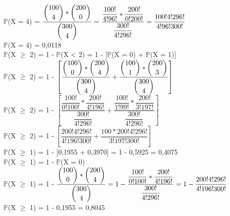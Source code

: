 \documentclass[12pt,a4paper,draft]{article}
\begin{document}
	\begin{center}
		$\mathbb{P}$(X = 4) = $\dfrac{\dbinom{100}{4} * \dbinom{200}{0}}{\dbinom{300}{4}} = \dfrac{\dfrac{100!}{4!96!} * \dfrac{200!}{0!200!}}{\dfrac{300!}{4!296!}} = \dfrac{100!4!296!}{4!96!300!}$
		\vspace{0.5cm}\\
		$\mathbb{P}$(X = 4) = 0,0118
		\vspace{1.5cm}\\
		$\mathbb{P}$(X $\geq$ 2) = 1 - $\mathbb{P}$(X < 2) = 1 - [$\mathbb{P}$(X = 0) + $\mathbb{P}$(X = 1)]
		\vspace{0.5cm}\\
		$\mathbb{P}$(X $\geq$ 2) = 1 - $\left[\dfrac{\dbinom{100}{0} * \dbinom{200}{4}}{\dbinom{300}{4}} + \dfrac{\dbinom{100}{1} * \dbinom{200}{3}}{\dbinom{300}{4}}\right]$ 
		\vspace{0.5cm}\\
		$\mathbb{P}$(X $\geq$ 2) = 1 - $\left[\dfrac{\dfrac{100!}{0!100!} * \dfrac{200!}{4!196!}}{\dfrac{300!}{4!296!}} + \dfrac{\dfrac{100!}{1!99!} * \dfrac{200!}{3!197!}}{\dfrac{300!}{4!296!}}\right]$
		\vspace{0.5cm}\\
		$\mathbb{P}$(X $\geq$ 2) = 1 - $\left[\dfrac{200!4!296!}{4!196!300!} + \dfrac{100 * 200!4!296!}{3!197!300!}\right]$
		\vspace{0.5cm}\\
		$\mathbb{P}$(X $\geq$ 1) = 1 - [0,1955 + 0,3970] = 1 - 0,5925 = 0,4075
		\vspace{1.5cm}\\
		$\mathbb{P}$(X $\geq$ 1) = 1 - $\mathbb{P}$(X = 0)
		\vspace{0.5cm}\\
		$\mathbb{P}$(X $\geq$ 1) = 1 - $\dfrac{\dbinom{100}{0} * \dbinom{200}{4}}{\dbinom{300}{4}} = 1 - \dfrac{\dfrac{100!}{0!100!} * \dfrac{200!}{4!196!}}{\dfrac{300!}{4!296!}} = 1 - \dfrac{200!4!296!}{4!196!300!}$
		\vspace{0.5cm}\\
		$\mathbb{P}$(X $\geq$ 1) = 1 - 0,1955 = 0,8045
	\end{center}
\end{document}
